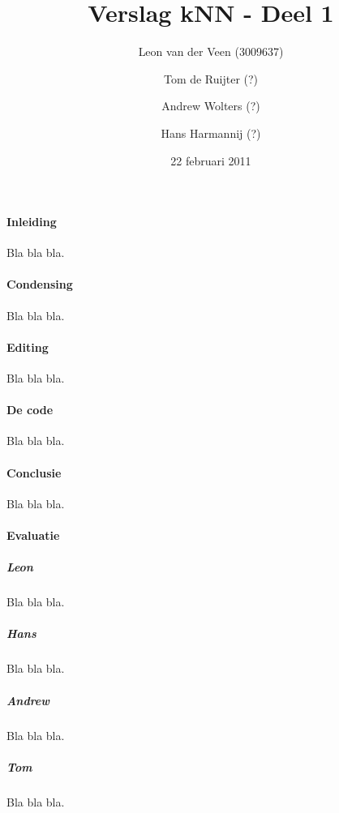 \documentclass[a4paper,12pt,pdf]{article}
\title{Verslag kNN - Deel 1}
\date{22 februari 2011}
\author{Leon van der Veen (3009637) \and Tom de Ruijter (?) \and Andrew Wolters (?) \and Hans Harmannij (?)}
\begin{document}
	\maketitle
	
	\paragraph{Inleiding}
		Bla bla bla.
		
	\paragraph{Condensing}
		Bla bla bla.
	
	\paragraph{Editing}
		Bla bla bla.
	
	\paragraph{De code}
		Bla bla bla.
	
	\paragraph{Conclusie}
		Bla bla bla.
	
	\paragraph{Evaluatie}
		\subparagraph{Leon}
			Bla bla bla.
		
		\subparagraph{Hans}
			Bla bla bla.
		
		\subparagraph{Andrew}
			Bla bla bla.
		
		\subparagraph{Tom}
			Bla bla bla.
	
\end{document}
